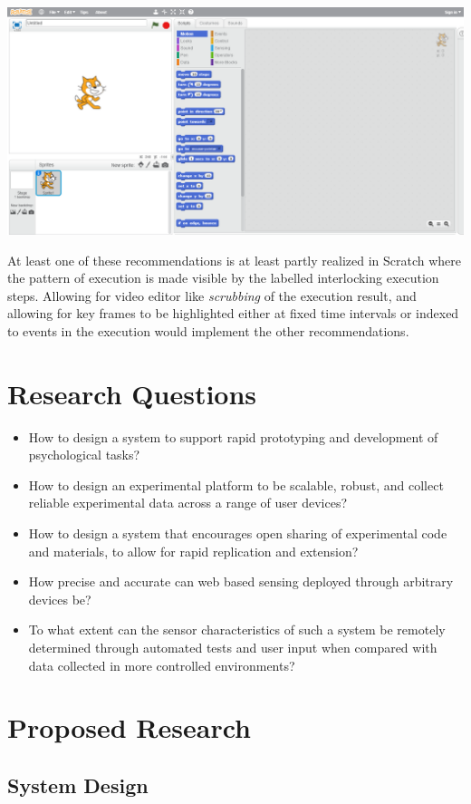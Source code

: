 \documentclass[12pt,a4paper,titlepage]{scrreprt}
\begin{document}
\includegraphics[scale=0.4]{Scratch_Layout}

At least one of these recommendations is at least partly realized in Scratch where the pattern of execution is made visible by the labelled interlocking execution steps. Allowing for video editor like \textit{scrubbing} of the execution result, and allowing for key frames to be highlighted either at fixed time intervals or indexed to events in the execution would implement the other recommendations.
\chapter{Research Questions}
\begin{itemize}
\item How to design a system to support rapid prototyping and development of psychological tasks?
\item How to design an experimental platform to be scalable, robust, and collect reliable experimental data across a range of user devices?
\item How to design a system that encourages open sharing of experimental code and materials, to allow for rapid replication and extension?
\item How precise and accurate can web based sensing deployed through arbitrary devices be?
\item To what extent can the sensor characteristics of such a system be remotely determined through automated tests and user input when compared with data collected in more controlled environments?
\end{itemize}
\chapter{Proposed Research}
\section{System Design}
\end{document}
